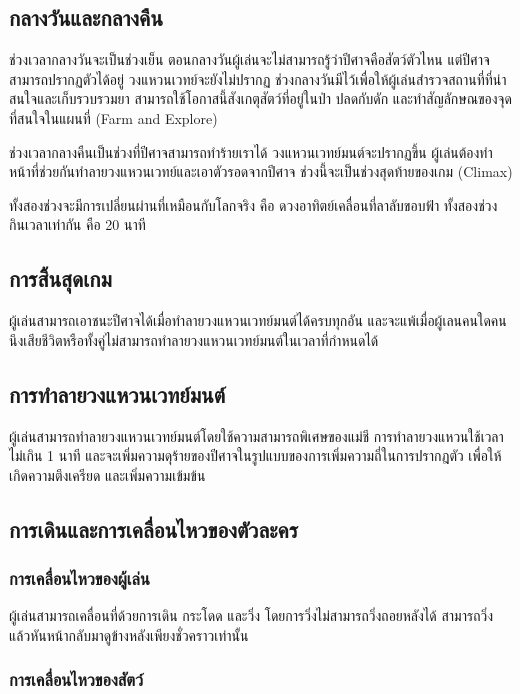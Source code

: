 \subsection{กลางวันและกลางคืน}

ช่วงเวลากลางวันจะเป็นช่วงเย็น ตอนกลางวันผู้เล่นจะไม่สามารถรู้ว่าปีศาจคือสัตว์ตัวไหน แต่ปีศาจสามารถปรากฏตัวได้อยู่ วงแหวนเวทย์จะยังไม่ปรากฏ ช่วงกลางวันมีไว้เพื่อให้ผู้เล่นสำรวจสถานที่ที่น่าสนใจและเก็บรวบรวมยา สามารถใช้โอกาสนี้สังเกตุสัตว์ที่อยู่ในป่า ปลดกับดัก และทำสัญลักษณของจุดที่สนใจในแผนที่ (Farm and Explore)

ช่วงเวลากลางคืนเป็นช่วงที่ปีศาจสามารถทำร้ายเราได้ วงแหวนเวทย์มนต์จะปรากฏขึ้น ผู้เล่นต้องทำหน้าที่ช่วยกันทำลายวงแหวนเวทย์และเอาตัวรอดจากปีศาจ ช่วงนี้จะเป็นช่วงสุดท้ายของเกม (Climax)

ทั้งสองช่วงจะมีการเปลี่ยนผ่านที่เหมือนกับโลกจริง คือ ดวงอาทิตย์เคลื่อนที่ลาลับขอบฟ้า ทั้งสองช่วงกินเวลาเท่ากัน คือ 20 นาที

\subsection{การสิ้นสุดเกม}

ผู้เล่นสามารถเอาชนะปีศาจได้เมื่อทำลายวงแหวนเวทย์มนต์ได้ครบทุกอัน และจะแพ้เมื่อผู้เลนคนใดคนนึงเสียชีวิตหรือทั้งคู่ไม่สามารถทำลายวงแหวนเวทย์มนต์ในเวลาที่กำหนดได้

\subsection{การทำลายวงแหวนเวทย์มนต์}

ผู้เล่นสามารถทำลายวงแหวนเวทย์มนต์โดยใช้ความสามารถพิเศษของแม่ชี การทำลายวงแหวนใช้เวลาไม่เกิน 1 นาที และจะเพิ่มความดุร้ายของปีศาจในรูปแบบของการเพิ่มความถี่ในการปรากฎตัว เพื่อให้เกิดความตึงเครียด และเพิ่มความเข้มข้น

\subsection{การเดินและการเคลื่อนไหวของตัวละคร}

\subsubsection{การเคลื่อนไหวของผู้เล่น}

ผู้เล่นสามารถเคลื่อนที่ด้วยการเดิน กระโดด และวิ่ง โดยการวิ่งไม่สามารถวิ่งถอยหลังได้ สามารถวิ่งแล้วหันหน้ากลับมาดูข้างหลังเพียงชั่วคราวเท่านั้น

\subsubsection{การเคลื่อนไหวของสัตว์}

